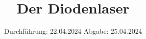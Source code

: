

\subject{VERSUCH NUMMER 60}
\title{Der Diodenlaser}
\date{
  Durchführung: 22.04.2024
  \hspace{3em}
  Abgabe: 25.04.2024
}



\maketitle
\thispagestyle{empty}
\tableofcontents
\newpage
\setcounter{page}{1}


%




\newpage
\printbibliography
\nocite{ap60}
\nocite{ap60.2}
\nocite{matplotlib}
\nocite{numpy}
\nocite{scipy}
\nocite{uncertainties}
\nocite{reback2020pandas}
\nocite{coherent}

\newpage
%
%


